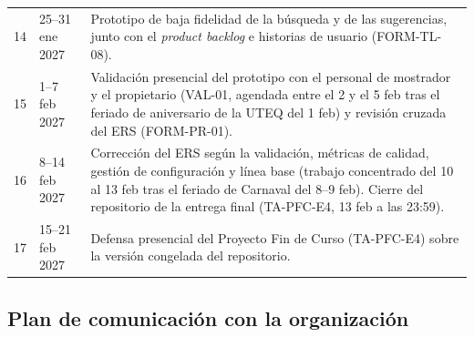 \begin{table}[H]
\begin{tabularx}{\textwidth}{@{}L{1.4cm}L{3.2cm}X@{}}
		14 & 25--31 ene 2027 & Prototipo de baja fidelidad de la búsqueda y de las sugerencias, junto con el \textit{product backlog} e historias de usuario (FORM-TL-08). \\
		15 & 1--7 feb 2027 & Validación presencial del prototipo con el personal de mostrador y el propietario (VAL-01, agendada entre el 2 y el 5 feb tras el feriado de aniversario de la UTEQ del 1 feb) y revisión cruzada del ERS (FORM-PR-01). \\
		16 & 8--14 feb 2027 & Corrección del ERS según la validación, métricas de calidad, gestión de configuración y línea base (trabajo concentrado del 10 al 13 feb tras el feriado de Carnaval del 8--9 feb). Cierre del repositorio de la entrega final (TA-PFC-E4, 13 feb a las 23:59). \\
		17 & 15--21 feb 2027 & Defensa presencial del Proyecto Fin de Curso (TA-PFC-E4) sobre la versión congelada del repositorio. \\
		\bottomrule
	\end{tabularx}
\end{table}

\subsection{Plan de comunicación con la organización}

